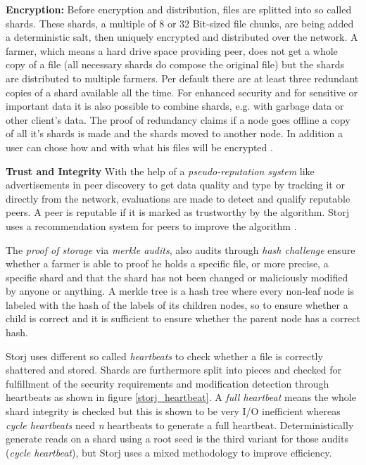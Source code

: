 \textbf{Encryption:} Before encryption and distribution, files are splitted into so called shards. These shards, a multiple of 8 or 32 Bit-sized file chunks, are being added a deterministic salt, then uniquely encrypted and distributed over the network. A farmer, which means a hard drive space providing peer, does not get a whole copy of a file (all necessary shards do compose the original file) but the shards are distributed to multiple farmers. Per default there are at least three redundant copies of a shard available all the time. For enhanced security and for sensitive or important data it is also possible to combine shards, e.g. with garbage data or other client's data. The proof of redundancy claims if a node goes offline a copy of all it's shards is made and the shards moved to another node. In addition a user can chose how and with what his files will be encrypted  \cite{storj:PDF}.

\textbf{Trust and Integrity} With the help of a \textit{pseudo-reputation system} like advertisements in peer discovery to get data quality and type by tracking it or directly from the network, evaluations are made to detect and qualify reputable peers. A peer is reputable if it is marked as trustworthy by the algorithm. Storj uses a recommendation system for peers to improve the algorithm \cite{storj:PDF}.

The \textit{proof of storage} via \textit{merkle audits}, also audits through \textit{hash challenge} ensure whether a farmer is able to proof he holds a specific file, or more precise, a specific shard and that the shard has not been changed or maliciously modified by anyone or anything. A merkle tree is a hash tree where every non-leaf node is labeled with the hash of the labels of its children nodes, so to ensure whether a child is correct and it is sufficient to ensure whether the parent node has a correct hash.

Storj uses different so called \textit{heartbeats} to check whether a file is correctly shattered and stored. Shards are furthermore split into pieces and checked for fulfillment of the security requirements and modification detection through heartbeats as shown in figure \ref{storj_heartbeat}. A \textit{full heartbeat} means the whole shard integrity is checked but this is shown to be very I/O inefficient whereas \textit{cycle heartbeats} need \textsl{n} heartbeats to generate a full heartbeat. Deterministically generate reads on a shard using a root seed is the third variant for those audits (\textit{cycle heartbeat}), but Storj uses a mixed methodology to improve efficiency.

